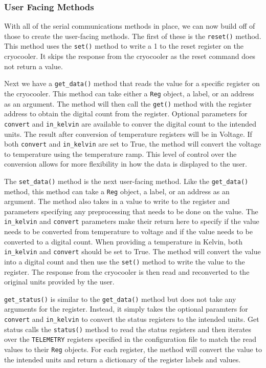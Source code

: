 \subsubsection{User Facing Methods}
With all of the serial communications methods in place, we can now build off of those to create the user-facing methods.
The first of these is the \texttt{reset()} method.
This method uses the \texttt{set()} method to write a 1 to the reset register on the cryocooler.
It skips the response from the cryocooler as the reset command does not return a value.

Next we have a \texttt{get\_data()} method that reads the value for a specific register on the cryocooler.
This method can take either a \texttt{Reg} object, a label, or an address as an argument.
The method will then call the \texttt{get()} method with the register address to obtain the digital count from the register.
Optional parameters for \texttt{convert} and \texttt{in\_kelvin} are available to conver the digital count to the intended units.
The result after conversion of temperature registers will be in Voltage.
If both \texttt{convert} and \texttt{in\_kelvin} are set to True, the method will convert the voltage to temperature using the temperature ramp.
This level of control over the conversion allows for more flexibility in how the data is displayed to the user.

The \texttt{set\_data()} method is the next user-facing method.
Like the \texttt{get\_data()} method, this method can take a \texttt{Reg} object, a label, or an address as an argument.
The method also takes in a value to write to the register and parameters specifying any preprocessing that needs to be done on the value.
The \texttt{in\_kelvin} and \texttt{convert} parameters make their return here to specify if the value needs to be converted from temperature to voltage and if the value needs to be converted to a digital count.
When providing a temperature in Kelvin, both \texttt{in\_kelvin} and \texttt{convert} should be set to True.
The method will convert the value into a digital count and then use the \texttt{set()} method to write the value to the register.
The response from the cryocooler is then read and reconverted to the original units provided by the user.

\texttt{get\_status()} is similar to the \texttt{get\_data()} method but does not take any arguments for the register.
Instead, it simply takes the optional paramters for \texttt{convert} and \texttt{in\_kelvin} to convert the status registers to the intended units.
Get status calls the \texttt{status()} method to read the status registers and then iterates over the \texttt{TELEMETRY} registers specified in the configuration file to match the read values to their \texttt{Reg} objects. 
For each register, the method will convert the value to the intended units and return a dictionary of the register labels and values.

